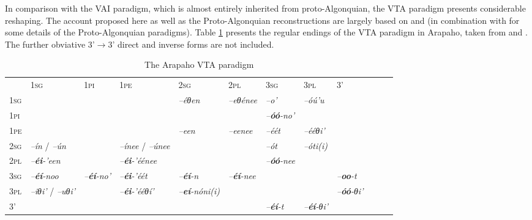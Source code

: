 \documentclass[twoside,a4paper,11pt]{article}
\newcommand{\ipa}[1]{{\phon\textit{#1}}}
\newcommand{\sg}{\textsc{sg}}
\newcommand{\pl}{\textsc{pl}}
\newcommand{\grise}[1]{\cellcolor{lightgray}\textbf{#1}}
\newcommand{\pli}{\textsc{pi}}
\newcommand{\pe}{\textsc{pe}}
\begin{document}
In comparison with the VAI paradigm, which is almost entirely inherited from proto-Algonquian, the VTA paradigm presents considerable reshaping. The account proposed here as well as the Proto-Algonquian reconstructions are largely based on  \citet[19-24]{goddard65arapaho} and \citet{goddard15morpho} (in combination with  \citealt{goddard00cheyenne} for some details of the Proto-Algonquian paradigms). Table \ref{tab:arapaho.vta}   presents the regular endings of the VTA paradigm in Arapaho, taken from  \citet[487-490]{cowell06arapaho} and \citet[448]{cowell05hinono}. The  further obviative 3'$\rightarrow$3' direct and inverse forms are not included.

\begin{table}[H]
\caption{The Arapaho VTA paradigm}
\centering \label{tab:arapaho.vta}
\begin{tabular}{llllllllllll}
\toprule
 & 	1\sg{}& 	1\pli{} & 	1\pe{} & 	2\sg{}& 	2\pl{}& 	3\sg{} & 	3\pl{} & 	3' & 	\\
1\sg{}& \grise{} & 	\grise{} & 	\grise{} & 	\ipa{--éθen} & 	\ipa{--eθénee} & 	\ipa{--o'} &\ipa{--óú'u}  	 & 	 & 	\\
1\pli{} & 	\grise{} & 	\grise{} & 	\grise{} & 	\grise{} & 	\grise{} & 	\ipa{--\textbf{óó}-no'} & 	 & 	 & 	\\
1\pe{} & 	\grise{} & 	\grise{} & 	\grise{} & 	\ipa{--een} & 	\ipa{--eenee} & 	\ipa{--éét} & 	\ipa{--ééθi'}  & 	 & 	\\
2\sg{}& 	\ipa{--ín} / \ipa{--ún}& 	\grise{} & \ipa{--ínee} /	\ipa{--únee} & 	\grise{} & 	\grise{} & 	\ipa{--ót} & 	 \ipa{--óti(i)}& 	 & 	\\
2\pl{}& 	\ipa{--\textbf{éi}-'een} & 	\grise{} & 	\ipa{--\textbf{éi}-'éénee} & 	\grise{} & 	\grise{} & 	\ipa{--\textbf{óó}-nee} & 	 & 	 & 	\\
3\sg{} & 	\ipa{--\textbf{éí}-noo} & 	\ipa{--\textbf{éí}-no'} & 	\ipa{--\textbf{éi}-'éét} & 	\ipa{--\textbf{éí}-n} & 	\ipa{--\textbf{éí}-nee} & 	\grise{} & 	\grise{} & 	\ipa{--\textbf{oo}-t} & 	\\
3\pl{}& \ipa{--iθi'} /	\ipa{--uθi'} & 	 & 	\ipa{--\textbf{éi}-'ééθí'}  & 	\ipa{--\textbf{eí}-nóni(i)}  & 	 & 	\grise{} & 	\grise{} & 	\ipa{--\textbf{óó}-θi'} & 	\\
3' & 	 & 	 & 	 & 	 & 	 & 	\ipa{--\textbf{éí}-t} & 	\ipa{--\textbf{éí}-θi'} &   & 	\\
\bottomrule
\end{tabular}
\end{table}
\end{document}
